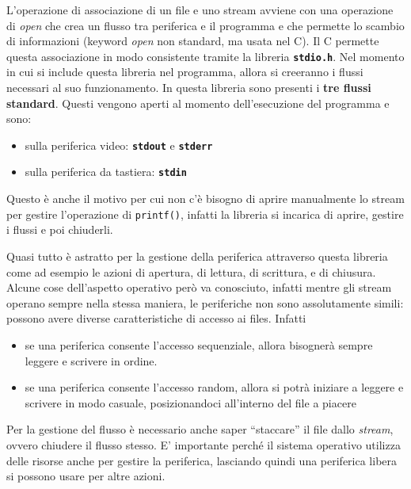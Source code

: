 \documentclass[
  paper=a4,
  oneside  ,captions=tableheading
]{scrbook}
\newcommand{\passthrough}[1]{#1}
\providecommand{\tightlist}{%
  \setlength{\itemsep}{0pt}\setlength{\parskip}{0pt}}
\begin{document}
L'operazione di associazione di un file e uno stream avviene con una
operazione di \emph{open} che crea un flusso tra periferica e il
programma e che permette lo scambio di informazioni (keyword \emph{open}
non standard, ma usata nel C). Il C permette questa associazione in modo
consistente tramite la libreria
\textbf{\passthrough{\lstinline!stdio.h!}}. Nel momento in cui si
include questa libreria nel programma, allora si creeranno i flussi
necessari al suo funzionamento. In questa libreria sono presenti i
\textbf{tre flussi standard}. Questi vengono aperti al momento
dell'esecuzione del programma e sono:

\begin{itemize}
\tightlist
\item
  sulla periferica video: \textbf{\passthrough{\lstinline!stdout!}} e
  \textbf{\passthrough{\lstinline!stderr!}}
\item
  sulla periferica da tastiera: \textbf{\passthrough{\lstinline!stdin!}}
\end{itemize}

Questo è anche il motivo per cui non c'è bisogno di aprire manualmente
lo stream per gestire l'operazione di
\passthrough{\lstinline!printf()!}, infatti la libreria si incarica di
aprire, gestire i flussi e poi chiuderli.

Quasi tutto è astratto per la gestione della periferica attraverso
questa libreria come ad esempio le azioni di apertura, di lettura, di
scrittura, e di chiusura. Alcune cose dell'aspetto operativo però va
conosciuto, infatti mentre gli stream operano sempre nella stessa
maniera, le periferiche non sono assolutamente simili: possono avere
diverse caratteristiche di accesso ai files. Infatti

\begin{itemize}
\tightlist
\item
  se una periferica consente l'accesso sequenziale, allora bisognerà
  sempre leggere e scrivere in ordine.
\item
  se una periferica consente l'accesso random, allora si potrà iniziare
  a leggere e scrivere in modo casuale, posizionandoci all'interno del
  file a piacere
\end{itemize}

Per la gestione del flusso è necessario anche saper ``staccare'' il file
dallo \emph{stream}, ovvero chiudere il flusso stesso. E' importante
perché il sistema operativo utilizza delle risorse anche per gestire la
periferica, lasciando quindi una periferica libera si possono usare per
altre azioni.
\end{document}
